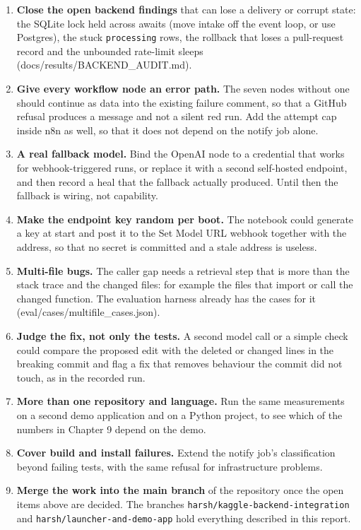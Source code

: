\begin{enumerate}[leftmargin=*, itemsep=2pt]
\item \textbf{Close the open backend findings} that can lose a delivery or corrupt state: the SQLite lock held across awaits (move intake off the event loop, or use Postgres), the stuck \texttt{processing} rows, the rollback that loses a pull-request record and the unbounded rate-limit sleeps (docs/\allowbreak{}results/\allowbreak{}BACKEND\_\allowbreak{}AUDIT.md).
\item \textbf{Give every workflow node an error path.} The seven nodes without one should continue as data into the existing failure comment, so that a GitHub refusal produces a message and not a silent red run. Add the attempt cap inside n8n as well, so that it does not depend on the notify job alone.
\item \textbf{A real fallback model.} Bind the OpenAI node to a credential that works for webhook-triggered runs, or replace it with a second self-hosted endpoint, and then record a heal that the fallback actually produced. Until then the fallback is wiring, not capability.
\item \textbf{Make the endpoint key random per boot.} The notebook could generate a key at start and post it to the Set Model URL webhook together with the address, so that no secret is committed and a stale address is useless.
\item \textbf{Multi-file bugs.} The caller gap needs a retrieval step that is more than the stack trace and the changed files: for example the files that import or call the changed function. The evaluation harness already has the cases for it (eval/\allowbreak{}cases/\allowbreak{}multifile\_\allowbreak{}cases.json).
\item \textbf{Judge the fix, not only the tests.} A second model call or a simple check could compare the proposed edit with the deleted or changed lines in the breaking commit and flag a fix that removes behaviour the commit did not touch, as in the recorded run.
\item \textbf{More than one repository and language.} Run the same measurements on a second demo application and on a Python project, to see which of the numbers in Chapter 9 depend on the demo.
\item \textbf{Cover build and install failures.} Extend the notify job's classification beyond failing tests, with the same refusal for infrastructure problems.
\item \textbf{Merge the work into the main branch} of the repository once the open items above are decided. The branches \texttt{harsh/\allowbreak{}kaggle-\allowbreak{}backend-\allowbreak{}integration} and \texttt{harsh/\allowbreak{}launcher-\allowbreak{}and-\allowbreak{}demo-\allowbreak{}app} hold everything described in this report.
\end{enumerate}
